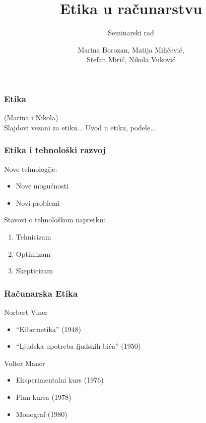 \documentclass[pdf]{beamer}
\title{Etika u računarstvu}
\subtitle{Seminarski rad}%
\author{Marina Borozan, Matija Miličević,\\
	Stefan Mirić, Nikola Vuković\\}
\begin{document}
\begin{frame}
	\titlepage	
	\end{frame}


\begin{frame}
\frametitle{Etika}

	(Marina i Nikola)\\
	Slajdovi vezani za etiku... Uvod u etiku, podele...

	\end{frame}


\begin{frame}
\frametitle{Etika i tehnološki razvoj}

	Nove tehnologije:

	\begin{itemize}

	\item Nove mogućnosti

	\item Novi problemi

	\end{itemize}

	Stavovi o tehnološkom napretku:

	\begin{enumerate}

	\item Tehnicizam
	\item Optimizam
	\item Skepticizam

	\end{enumerate}

	\end{frame}


\begin{frame}
\frametitle{Računarska Etika}
	
	Norbert Viner
	\begin{itemize}
	\item ``Kibernetika'' (1948) %
	\item ``Ljudska upotreba ljudskih bića'' (1950)
	\end{itemize}
	
	Volter Maner
	\begin{itemize}
	\item Eksperimentalni kurs (1976)
	\item Plan kursa (1978)	
	\item Monograf (1980) %
	\end{itemize}
	\end{frame}
\end{document}

